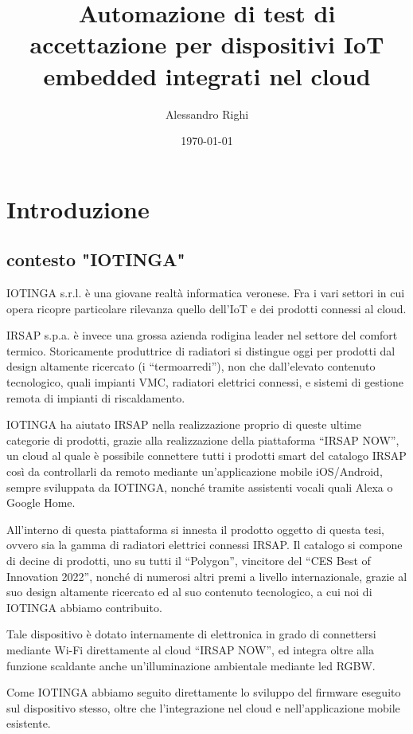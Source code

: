 \documentclass{article}
\title{Automazione di test di accettazione per dispositivi IoT embedded integrati nel cloud}
\author{Alessandro Righi}
\date{\today}
\begin{document}
\maketitle
\pagebreak
\tableofcontents
\pagebreak

\section{Introduzione}
\subsection{contesto "IOTINGA"}

IOTINGA s.r.l. è una giovane realtà informatica veronese. Fra i vari settori in cui
opera ricopre particolare rilevanza quello dell'IoT e dei prodotti connessi al cloud.

IRSAP s.p.a. è invece una grossa azienda rodigina leader nel settore del comfort termico.
Storicamente produttrice di radiatori si distingue oggi per prodotti dal design altamente
ricercato (i ``termoarredi''), non che dall'elevato contenuto tecnologico, quali
impianti VMC, radiatori elettrici connessi, e sistemi di gestione remota di impianti di riscaldamento.

IOTINGA ha aiutato IRSAP nella realizzazione proprio di queste ultime categorie di
prodotti, grazie alla realizzazione della piattaforma ``IRSAP NOW'', un cloud
al quale è possibile connettere tutti i prodotti smart del catalogo IRSAP così da controllarli
da remoto mediante un'applicazione mobile iOS/Android, sempre sviluppata da IOTINGA,
nonché tramite assistenti vocali quali Alexa o Google Home.

All'interno di questa piattaforma si innesta il prodotto oggetto di questa tesi,
ovvero sia la gamma di radiatori elettrici connessi IRSAP. Il catalogo si compone di
decine di prodotti, uno su tutti il ``Polygon'', vincitore del ``CES Best of Innovation 2022'',
nonché di numerosi altri premi a livello internazionale, grazie al suo design
altamente ricercato ed al suo contenuto tecnologico, a cui noi di IOTINGA abbiamo contribuito.

Tale dispositivo è dotato internamente di elettronica in grado di connettersi mediante
Wi-Fi direttamente al cloud ``IRSAP NOW'', ed integra oltre alla funzione scaldante
anche un'illuminazione ambientale mediante led RGBW.

Come IOTINGA abbiamo seguito direttamente lo sviluppo del firmware eseguito sul
dispositivo stesso, oltre che l'integrazione nel cloud e nell'applicazione mobile esistente.
\end{document}

